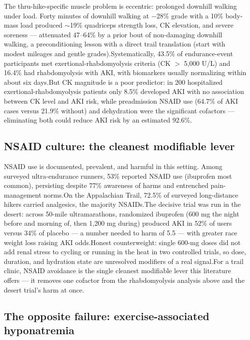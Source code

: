 \documentclass[11pt]{article}
\newcommand{\src}[1]{\allowbreak[#1]}
\begin{document}
The thru-hike-specific muscle problem is eccentric: prolonged downhill walking under load. Forty minutes of downhill walking at $-$28\% grade with a 10\% body-mass load produced $\sim$19\% quadriceps strength loss, CK elevation, and severe soreness --- attenuated 47--64\% by a prior bout of non-damaging downhill walking, a preconditioning lesson with a direct trail translation (start with modest mileages and gentle grades).\src{180} Systematically, 43.5\% of endurance-event participants met exertional-rhabdomyolysis criteria (CK $>$ 5{,}000 U/L) and 16.4\% had rhabdomyolysis with AKI, with biomarkers usually normalizing within about six days.\src{176} But CK magnitude is a poor predictor: in 200 hospitalized exertional-rhabdomyolysis patients only 8.5\% developed AKI with no association between CK level and AKI risk, while preadmission NSAID use (64.7\% of AKI cases versus 21.9\% without) and dehydration were the significant cofactors --- eliminating both could reduce AKI risk by an estimated 92.6\%.\src{177}

\subsection{NSAID culture: the cleanest modifiable lever}

NSAID use is documented, prevalent, and harmful in this setting. Among surveyed ultra-endurance runners, 53\% reported NSAID use (ibuprofen most common), persisting despite 77\% awareness of harms and entrenched pain-management norms.\src{182} On the Appalachian Trail, 72.5\% of surveyed long-distance hikers carried analgesics, the majority NSAIDs.\src{187} The decisive trial was run in the desert: across 50-mile ultramarathons, randomized ibuprofen (600 mg the night before and morning of, then 1{,}200 mg during) produced AKI in 52\% of users versus 34\% of placebo --- a number needed to harm of 5.5 --- with greater race weight loss raising AKI odds.\src{181} Honest counterweight: single 600-mg doses did not add renal stress to cycling or running in the heat in two controlled trials, so dose, duration, and hydration state are unresolved modifiers of a real signal.\src{183}\src{184} For a trail clinic, NSAID avoidance is the single cleanest modifiable lever this literature offers --- it removes one cofactor from the rhabdomyolysis analysis above and the desert trial's harm at once.\src{177}\src{181}

\subsection{The opposite failure: exercise-associated hyponatremia}
\end{document}
